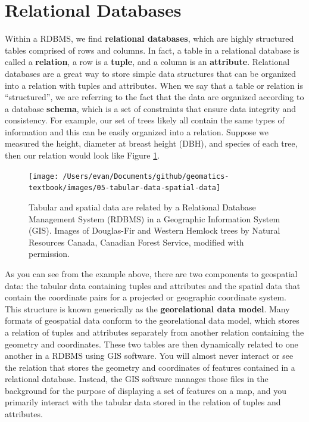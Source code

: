 \documentclass[
]{book}
\begin{document}
\hypertarget{relational-databases-1}{%
\section{Relational Databases}\label{relational-databases-1}}

Within a RDBMS, we find \textbf{relational databases}, which are highly structured tables comprised of rows and columns. In fact, a table in a relational database is called a \textbf{relation}, a row is a \textbf{tuple}, and a column is an \textbf{attribute}. Relational databases are a great way to store simple data structures that can be organized into a relation with tuples and attributes. When we say that a table or relation is ``structured'', we are referring to the fact that the data are organized according to a database \textbf{schema}, which is a set of constraints that ensure data integrity and consistency. For example, our set of trees likely all contain the same types of information and this can be easily organized into a relation. Suppose we measured the height, diameter at breast height (DBH), and species of each tree, then our relation would look like Figure \ref{fig:5-tabular-data-spatial-data}.

\begin{figure}
\texttt{[image: /Users/evan/Documents/github/geomatics-textbook/images/05-tabular-data-spatial-data]} \caption{Tabular and spatial data are related by a Relational Database Management System (RDBMS) in a Geographic Information System (GIS). Images of Douglas-Fir and Western Hemlock trees by Natural Resources Canada, Canadian Forest Service, modified with permission.}\label{fig:5-tabular-data-spatial-data}
\end{figure}

As you can see from the example above, there are two components to geospatial data: the tabular data containing tuples and attributes and the spatial data that contain the coordinate pairs for a projected or geographic coordinate system. This structure is known generically as the \textbf{georelational data model}. Many formats of geospatial data conform to the georelational data model, which stores a relation of tuples and attributes separately from another relation containing the geometry and coordinates. These two tables are then dynamically related to one another in a RDBMS using GIS software. You will almost never interact or see the relation that stores the geometry and coordinates of features contained in a relational database. Instead, the GIS software manages those files in the background for the purpose of displaying a set of features on a map, and you primarily interact with the tabular data stored in the relation of tuples and attributes.
\end{document}

